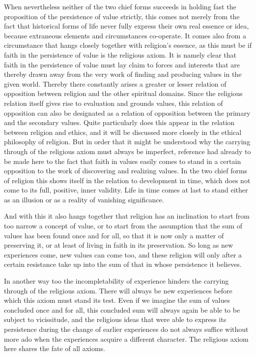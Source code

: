 \documentclass[12pt,a4paper]{book}
\newcommand{\opage}[1]{\marginnote{\footnotesize\textit{[#1]}}}
\begin{document}
When nevertheless neither of the two chief forms succeeds in holding fast the proposition of
the persistence of value strictly, this comes not merely from the fact that historical forms
of life never fully express their own real essence or idea, because extraneous elements and
circumstances co-operate. It comes also from a circumstance that hangs closely together with
religion's essence, as this must be if faith in the persistence of value is the religious
axiom. It is namely clear that faith in the persistence of value must lay claim to forces and
interests that are thereby drawn away from the very work of finding and producing values in
the given world. Thereby there constantly arises a greater or lesser relation of opposition
between religion and the other spiritual domains. Since the religious relation itself gives
rise to evaluation and grounds values, this relation of opposition can also be designated as a
relation of opposition between the primary and the secondary values. Quite particularly does
this appear in the relation between religion and ethics, and it will be discussed more closely
in the ethical philosophy of religion. But in order that it might be understood why the carrying
through of the religious axiom must always be imperfect, reference had already to be made here
to the fact that faith in values easily comes to stand in a certain opposition to the work of
discovering and realizing values. In the two chief 
\opage{164}forms of religion this shows itself in the
relation to development in time, which does not come to its full, positive, inner validity. Life
in time comes at last to stand either as an illusion or as a reality of vanishing significance.

And with this it also hangs together that religion has an inclination to start from too narrow a
concept of value, or to start from the assumption that the sum of values has been found once and
for all, so that it is now only a matter of preserving it, or at least of living in faith in its
preservation. So long as new experiences come, new values can come too, and these religion will
only after a certain resistance take up into the sum of that in whose persistence it believes.

In another way too the incompletability of experience hinders the carrying through of the
religious axiom. There will always be new experiences before which this axiom must stand its
test. Even if we imagine the sum of values concluded once and for all, this concluded sum will
always again be able to be subject to vicissitude, and the religious ideas that were able to
express its persistence during the change of earlier experiences do not always suffice without
more ado when the experiences acquire a different character. The religious axiom here shares the
fate of all axioms.
\end{document}

